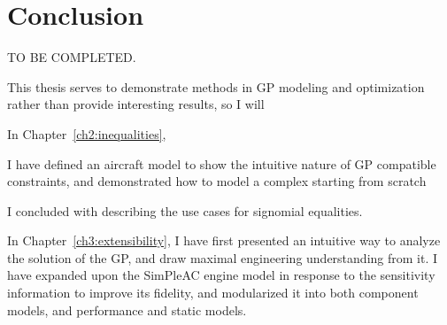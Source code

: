 \chapter{Conclusion}
\label{ch5:conclusion}

TO BE COMPLETED.

This thesis serves to demonstrate methods in \gls{GP} modeling and optimization
rather than provide interesting results, so I will

In Chapter~\ref{ch2:inequalities},

I have defined an aircraft model to show the intuitive nature of \gls{GP}
compatible constraints, and demonstrated how to model a complex
starting from scratch

I concluded with describing the use cases for signomial equalities.

In Chapter~\ref{ch3:extensibility}, I have first presented an intuitive
way to analyze the solution of the \gls{GP}, and draw maximal engineering
understanding from it. I have expanded upon the SimPleAC engine model
in response to the sensitivity information to improve its fidelity,
and modularized it into both component models, and performance and static models.


